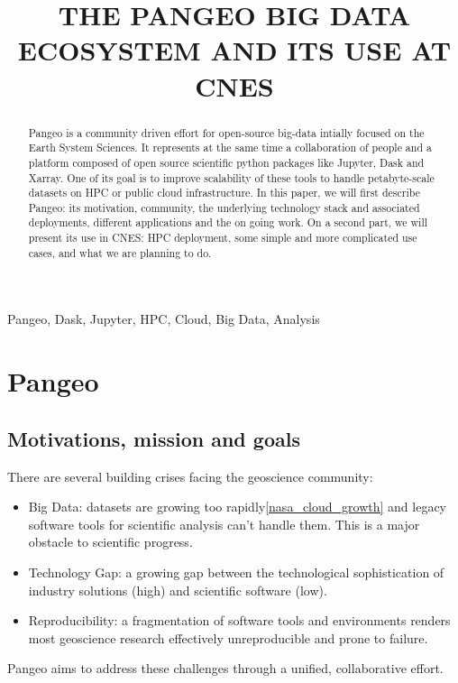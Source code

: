 \documentclass{article}
\title{THE PANGEO BIG DATA ECOSYSTEM AND ITS USE AT CNES}
\begin{document}
%
\maketitle
%
\begin{abstract}
Pangeo\cite{b1} is a community driven effort for open-source big-data intially focused on the Earth System Sciences. It represents at the same time a collaboration of people and a platform composed of open source scientific python packages like Jupyter, Dask and Xarray. One of its goal is to improve scalability of these tools to handle petabyte-scale datasets on HPC or public cloud infrastructure.
In this paper, we will first describe Pangeo: its motivation, community, the underlying technology stack and associated deployments, different applications and the on going work. On a second part, we will present its use in CNES: HPC deployment, some simple and more complicated use cases, and what we are planning to do.
\end{abstract}
%
\begin{keywords}
Pangeo, Dask, Jupyter, HPC, Cloud, Big Data, Analysis
\end{keywords}
%
\section{Pangeo}
\label{sec:pangeo}

\subsection{Motivations, mission and goals}
\label{ssec:motivations}

There are several building crises facing the geoscience community:

\begin{itemize}
\item Big Data: datasets are growing too rapidly\ref{nasa_cloud_growth} and legacy software tools for scientific analysis can’t handle them. This is a major obstacle to scientific progress.
\item Technology Gap: a growing gap between the technological sophistication of industry solutions (high) and scientific software (low).
\item Reproducibility: a fragmentation of software tools and environments renders most geoscience research effectively unreproducible and prone to failure.
\end{itemize}

Pangeo aims to address these challenges through a unified, collaborative effort.
\end{document}
